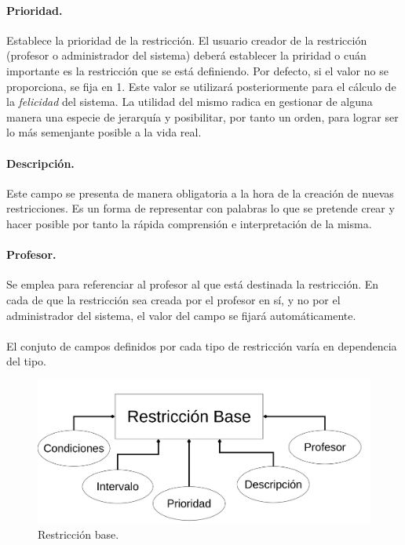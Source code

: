 \paragraph{Prioridad.}
\label{def:priority}
Establece la prioridad de la restricción. El usuario creador de la restricción (profesor o administrador del sistema) deberá establecer la priridad o cuán importante es la restricción que se está definiendo. Por defecto, si el valor no se proporciona, se fija en 1. Este valor se utilizará posteriormente para el cálculo de la \textit{felicidad} del sistema. La utilidad del mismo radica en gestionar de alguna manera una especie de jerarquía y posibilitar, por tanto un orden, para lograr ser lo más semenjante posible a la vida real.

\paragraph{Descripción.}
Este campo se presenta de manera obligatoria a la hora de la creación de nuevas restricciones. Es un forma de representar con palabras lo que se pretende crear y hacer posible por tanto la rápida comprensión e interpretación de la misma. 

\paragraph{Profesor.}
Se emplea para referenciar al profesor al que está destinada la restricción. En cada de que la restricción sea creada por el profesor en sí, y no por el administrador del sistema, el valor del campo se fijará automáticamente. \\\\

El conjuto de campos definidos por cada tipo de restricción varía en dependencia del tipo.

\begin{figure}[h]
	\centering
	\includegraphics[width=0.75\linewidth]{images/Chapter 2/base_restrictions}
	\caption{Restricción base.}
	\label{fig:base_restrictions}
\end{figure}

